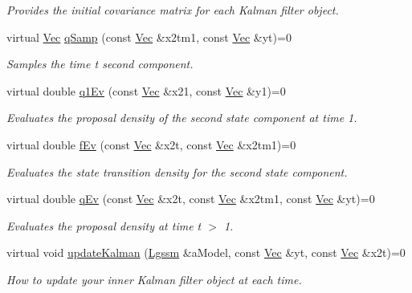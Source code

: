 \begin{DoxyCompactItemize}
\begin{DoxyCompactList}\small\item\em Provides the initial covariance matrix for each Kalman filter object. \end{DoxyCompactList}\item 
virtual \hyperlink{pmfs_8h_a4c7df05c6f5e8a0d15ae14bcdbc07152}{Vec} \hyperlink{classKalman__RBPF_ad3ee89a06a18a287445e366230a6bd65}{q\+Samp} (const \hyperlink{pmfs_8h_a4c7df05c6f5e8a0d15ae14bcdbc07152}{Vec} \&x2tm1, const \hyperlink{pmfs_8h_a4c7df05c6f5e8a0d15ae14bcdbc07152}{Vec} \&yt)=0
\begin{DoxyCompactList}\small\item\em Samples the time t second component. \end{DoxyCompactList}\item 
virtual double \hyperlink{classKalman__RBPF_a36b66fd90b6d810d88e5ec9785cb0307}{q1\+Ev} (const \hyperlink{pmfs_8h_a4c7df05c6f5e8a0d15ae14bcdbc07152}{Vec} \&x21, const \hyperlink{pmfs_8h_a4c7df05c6f5e8a0d15ae14bcdbc07152}{Vec} \&y1)=0
\begin{DoxyCompactList}\small\item\em Evaluates the proposal density of the second state component at time 1. \end{DoxyCompactList}\item 
virtual double \hyperlink{classKalman__RBPF_a03bfc2e7f32a86ab4fe653958d2f7dd4}{f\+Ev} (const \hyperlink{pmfs_8h_a4c7df05c6f5e8a0d15ae14bcdbc07152}{Vec} \&x2t, const \hyperlink{pmfs_8h_a4c7df05c6f5e8a0d15ae14bcdbc07152}{Vec} \&x2tm1)=0
\begin{DoxyCompactList}\small\item\em Evaluates the state transition density for the second state component. \end{DoxyCompactList}\item 
virtual double \hyperlink{classKalman__RBPF_ad5b8e717c5d4c838b0d246b496971d16}{q\+Ev} (const \hyperlink{pmfs_8h_a4c7df05c6f5e8a0d15ae14bcdbc07152}{Vec} \&x2t, const \hyperlink{pmfs_8h_a4c7df05c6f5e8a0d15ae14bcdbc07152}{Vec} \&x2tm1, const \hyperlink{pmfs_8h_a4c7df05c6f5e8a0d15ae14bcdbc07152}{Vec} \&yt)=0
\begin{DoxyCompactList}\small\item\em Evaluates the proposal density at time t $>$ 1. \end{DoxyCompactList}\item 
virtual void \hyperlink{classKalman__RBPF_a67abffa6fe0510147037ed102aa30ed0}{update\+Kalman} (\hyperlink{classLgssm}{Lgssm} \&a\+Model, const \hyperlink{pmfs_8h_a4c7df05c6f5e8a0d15ae14bcdbc07152}{Vec} \&yt, const \hyperlink{pmfs_8h_a4c7df05c6f5e8a0d15ae14bcdbc07152}{Vec} \&x2t)=0
\begin{DoxyCompactList}\small\item\em How to update your inner Kalman filter object at each time. \end{DoxyCompactList}\end{DoxyCompactItemize}


